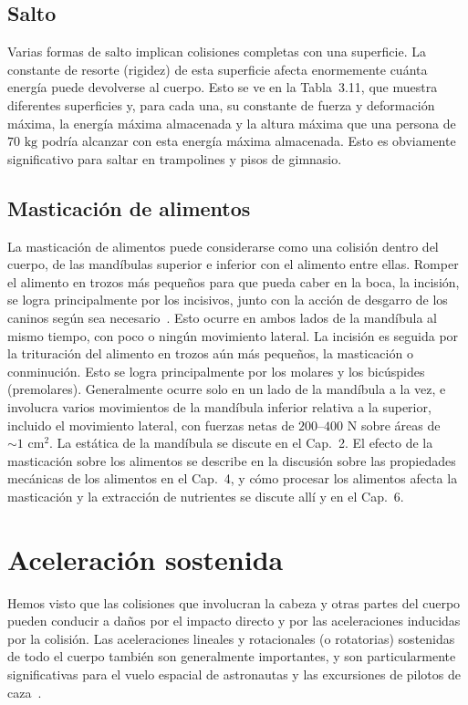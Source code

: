 \documentclass[12pt]{book}
\begin{document}
\subsection{Salto}

Varias formas de salto implican colisiones completas con una superficie. La constante de resorte (rigidez) de esta superficie afecta enormemente cuánta energía puede devolverse al cuerpo. Esto se ve en la Tabla~3.11, que muestra diferentes superficies y, para cada una, su constante de fuerza y deformación máxima, la energía máxima almacenada y la altura máxima que una persona de $70\text{ kg}$ podría alcanzar con esta energía máxima almacenada. Esto es obviamente significativo para saltar en trampolines y pisos de gimnasio.

\subsection{Masticación de alimentos}

La masticación de alimentos puede considerarse como una colisión dentro del cuerpo, de las mandíbulas superior e inferior con el alimento entre ellas. Romper el alimento en trozos más pequeños para que pueda caber en la boca, la incisión, se logra principalmente por los incisivos, junto con la acción de desgarro de los caninos según sea necesario~\cite{ref86}. Esto ocurre en ambos lados de la mandíbula al mismo tiempo, con poco o ningún movimiento lateral. La incisión es seguida por la trituración del alimento en trozos aún más pequeños, la masticación o conminución. Esto se logra principalmente por los molares y los bicúspides (premolares). Generalmente ocurre solo en un lado de la mandíbula a la vez, e involucra varios movimientos de la mandíbula inferior relativa a la superior, incluido el movimiento lateral, con fuerzas netas de $200$--$400\text{ N}$ sobre áreas de $\sim 1\text{ cm}^2$. La estática de la mandíbula se discute en el Cap.~2. El efecto de la masticación sobre los alimentos se describe en la discusión sobre las propiedades mecánicas de los alimentos en el Cap.~4, y cómo procesar los alimentos afecta la masticación y la extracción de nutrientes se discute allí y en el Cap.~6.

\section{Aceleración sostenida}

Hemos visto que las colisiones que involucran la cabeza y otras partes del cuerpo pueden conducir a daños por el impacto directo y por las aceleraciones inducidas por la colisión. Las aceleraciones lineales y rotacionales (o rotatorias) sostenidas de todo el cuerpo también son generalmente importantes, y son particularmente significativas para el vuelo espacial de astronautas y las excursiones de pilotos de caza~\cite{ref50,ref51}.
\end{document}
